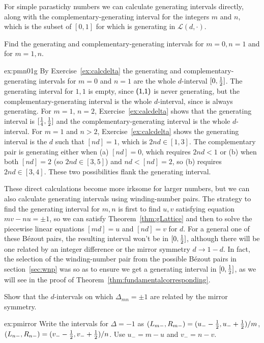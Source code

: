 For simple parastichy numbers we can calculate generating intervals directly, along with the 
complementary-generating interval for the integers $m$ and $n$, which is the subset of  $[0,1]$ for which   is generating in  $\mathcal{L}(d,\cdot)$.
\begin{jExercise}\label{ex:pmn01g}
	Find the generating and complementary-generating intervals for $m=0,n=1$ and for $m=1,n$. 
\end{jExercise}
\begin{jAnswer}{ex:pmn01g}{
	 By Exercise~\ref{ex:calcdelta} the generating and complementary-generating intervals for $m=0$ and $n=1$ are the whole $d$-interval  $[0,\textstyle{\frac{1}{2}}]$.  
	The generating interval for $1,1$ is empty, since $\textsf{(1,1)}$ is never generating, but the complementary-generating interval is the whole $d$-interval, since  is always generating.
For $m=1$, $n=2$, Exercise~\ref{ex:calcdelta} shows that the generating interval is $[\textstyle{\frac{1}{4}},\textstyle{\frac{1}{2}}]$ and the complementary-generating interval is the whole $d$-interval.
For $m=1$ and $n>2$,  Exercise~\ref{ex:calcdelta} shows the generating interval is the $d$ such that $[nd]=1$, which is $2nd\in [1,3]$.  
The complementary pair is generating either when (a) $[nd]=0$, which requires $2nd<1$ or (b) when both $[nd]=2$ (so $2nd\in [3,5]$) and $nd<[nd]=2$,
so (b) requires $2nd\in[3,4]$. These two possibilities flank the generating interval.
}\end{jAnswer}
These direct calculations become more irksome for larger numbers, but we can also calculate generating intervals using winding-number pairs. The strategy to find the generating interval for ${m,n}$ is first to find $u,v$ satisfying equation $mv-nu=\pm 1$, so we can satisfy Theorem~\ref{thm:gLattice} and then to solve the piecewise linear equations $[md]=u$ and $[nd]=v$ for $d$. For a general one of these B\'ezout pairs, the resulting interval won't be in $[0,\textstyle{\frac{1}{2}}]$, although there will be one related by an integer difference or the mirror symmetry $d\rightarrow1-d$. In fact, the selection of the winding-number pair from the possible B\'ezout pairs in section~\ref{sec:wnp} was so as to ensure we get a generating interval in $[0,\textstyle{\frac{1}{2}}]$, as we will see in the proof of Theorem~\ref{thm:fundamentalcorresponding}. 


\begin{jExercise}\label{ex:pmirror}
	Show that the $d$-intervals on which
	$\Delta_{mn}=\pm1$ are related by the mirror symmetry.
\end{jExercise}
\begin{jAnswer}{ex:pmirror}{
	Write the intervals for $\Delta=-1$ as $(L_{m-},R_{m-})= (u_--\textstyle{\frac{1}{2}},u_-+\textstyle{\frac{1}{2}})/m$, $(L_{n-},R_{n-})= (v_--\textstyle{\frac{1}{2}},v_-+\textstyle{\frac{1}{2}})/n$.
	Use $u_-=m-u$ and $v_-=n-v$. 
}\end{jAnswer}

